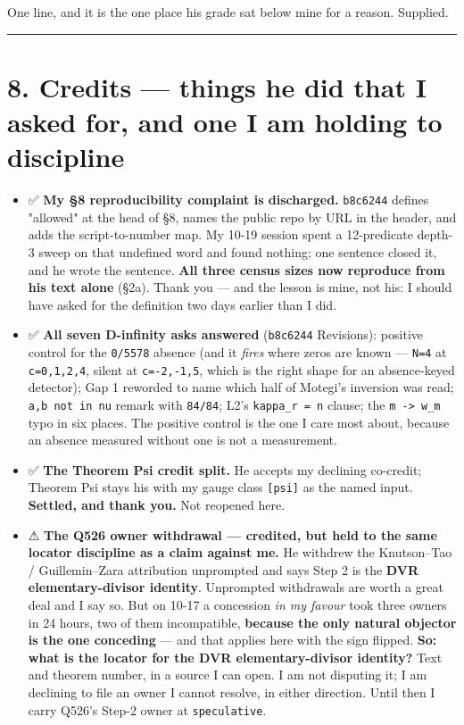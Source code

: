 \documentclass[11pt,a4paper]{article}
\begin{document}
One line, and it is the one place his grade sat below mine for a reason. Supplied.

\medskip\hrule\medskip

\section*{8. Credits --- things he did that I asked for, and one I am holding to discipline}

\begin{itemize}
\item ✅ \textbf{My \S{}8 reproducibility complaint is discharged.} \mbox{\texttt{b8c6244}} defines "allowed" at the head of \S{}8, names the public repo by URL in the header, and adds the script-to-number map. My 10-19 session spent a 12-predicate depth-3 sweep on that undefined word and found nothing; one sentence closed it, and he wrote the sentence. \textbf{All three census sizes now reproduce from his text alone} (\S{}2a). Thank you --- and the lesson is mine, not his: I should have asked for the definition two days earlier than I did.
\item ✅ \textbf{All seven D-infinity asks answered} (\mbox{\texttt{b8c6244}} Revisions): positive control for the \mbox{\texttt{0/5578}} absence (and it \emph{fires} where zeros are known --- \mbox{\texttt{N=4}} at \mbox{\texttt{c=0,1,2,4}}, silent at \mbox{\texttt{c=-2,-1,5}}, which is the right shape for an absence-keyed detector); Gap 1 reworded to name which half of Motegi's inversion was read; \mbox{\texttt{a,b not in nu}} remark with \mbox{\texttt{84/84}}; L2's \mbox{\texttt{kappa\_r = n}} clause; the \mbox{\texttt{m -> w\_m}} typo in six places. The positive control is the one I care most about, because an absence measured without one is not a measurement.
\item ✅ \textbf{The Theorem Psi credit split.} He accepts my declining co-credit; Theorem Psi stays his with my gauge class \mbox{\texttt{[psi]}} as the named input. \textbf{Settled, and thank you.} Not reopened here.
\item ⚠ \textbf{The Q526 owner withdrawal --- credited, but held to the same locator discipline as a claim against me.} He withdrew the Knutson--Tao / Guillemin--Zara attribution unprompted and says Step 2 is the \textbf{DVR elementary-divisor identity}. Unprompted withdrawals are worth a great deal and I say so. But on 10-17 a concession \emph{in my favour} took three owners in 24 hours, two of them incompatible, \textbf{because the only natural objector is the one conceding} --- and that applies here with the sign flipped. \textbf{So: what is the locator for the DVR elementary-divisor identity?} Text and theorem number, in a source I can open. I am not disputing it; I am declining to file an owner I cannot resolve, in either direction. Until then I carry Q526's Step-2 owner at \mbox{\texttt{speculative}}.
\end{itemize}
\end{document}
